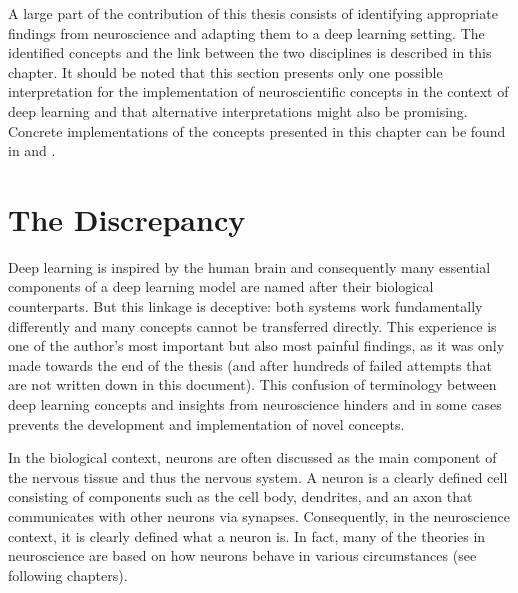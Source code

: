 A large part of the contribution of this thesis consists of identifying appropriate findings from neuroscience and adapting them to a deep learning setting.
The identified concepts and the link between the two disciplines is described in this chapter.
It should be noted that this section presents only one possible interpretation for the implementation of neuroscientific concepts in the context of deep learning and that alternative interpretations might also be promising.
Concrete implementations of the concepts presented in this chapter can be found in  and .


\section{The Discrepancy}
Deep learning is inspired by the human brain and consequently many essential components of a deep learning model are named after their biological counterparts. But this linkage is deceptive: both systems work fundamentally differently and many concepts cannot be transferred directly.
This experience is one of the author's most important but also most painful findings, as it was only made towards the end of the thesis (and after hundreds of failed attempts that are not written down in this document). This confusion of terminology between deep learning concepts and insights from neuroscience hinders and in some cases prevents the development and implementation of novel concepts. 

In the biological context, neurons are often discussed as the main component of the nervous tissue and thus the nervous system.
A neuron is a clearly defined cell consisting of components such as the cell body, dendrites, and an axon that communicates with other neurons via synapses.
Consequently, in the neuroscience context, it is clearly defined what a neuron is. In fact, many of the theories in neuroscience are based on how neurons behave in various circumstances (see following chapters). 

